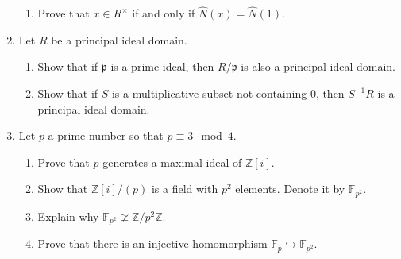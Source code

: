 \documentclass[11pt]{article}
\newcommand{\bF}{\mathbb{F}}
\newcommand{\bZ}{\mathbb{Z}}
\newcommand{\fp}{\mathfrak{p}}
\begin{document}
\begin{enumerate}
{\begin{enumerate}
{    Let $\hat N:R\to\bZ$ be given by the following rule.
    \[\hat N(r) = \min_{x\in R\setminus\{0\}} N(xr).\]
    Prove that $\hat N$ is a Euclidean norm on $R$, and also that it satisfies the further condition that if $a|b$ then $\hat N(a)\le\hat N(b)$.
    }
    \item{
    Prove that $x\in R^\times$ if and only if $\hat N(x)=\hat N(1)$.
    }
  \end{enumerate}
  }
  \item{
  Let $R$ be a principal ideal domain.
  \begin{enumerate}
    \item{
    Show that if $\fp$ is a prime ideal, then $R/\fp$ is also a principal ideal domain.
    }
    \item{
    Show that if $S$ is a multiplicative subset not containing $0$, then $S^{-1}R$ is a principal ideal domain.
    }
  \end{enumerate}
  }
  \item{
  Let $p$ a prime number so that $p\equiv3\mod 4$.
  \begin{enumerate}
    \item{
    Prove that $p$ generates a maximal ideal of $\bZ[i]$.
    }
    \item{
    Show that $\bZ[i]/(p)$ is a field with $p^2$ elements.  Denote it by $\bF_{p^2}$.
    }
    \item{
    Explain why $\bF_{p^2}\not\cong\bZ/p^2\bZ$.
    }
    \item{
    Prove that there is an injective homomorphism $\bF_p\hookrightarrow\bF_{p^2}$.
    }
  \end{enumerate}
  }
\end{enumerate}
\end{document}
